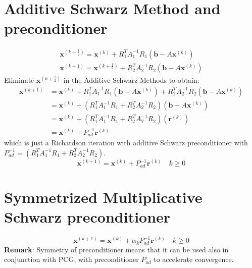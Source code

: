 \documentclass[11pt]{book}
\begin{document}
\section*{Additive Schwarz Method and preconditioner}

$$
\begin{gathered}
\mathbf{x}^{\left(k+\frac{1}{2}\right)}=\mathbf{x}^{(k)}+R_1^T A_1^{-1} R_1\left(\mathbf{b}-A \mathbf{x}^{(k)}\right) \\
\mathbf{x}^{(k+1)}=\mathbf{x}^{\left(k+\frac{1}{2}\right)}+R_2^T A_2^{-1} R_2\left(\mathbf{b}-A \mathbf{x}^{(k)}\right)
\end{gathered}
$$
Eliminate $\mathbf{x}^{\left(k+\frac{1}{2}\right)}$ in the Additive Schwarz Methods to obtain:
$$
\begin{aligned}
\mathbf{x}^{(k+1)} & =\mathbf{x}^{(k)}+R_1^T A_1^{-1} R_1\left(\mathbf{b}-A \mathbf{x}^{(k)}\right)+R_2^T A_2^{-1} R_2\left(\mathbf{b}-A \mathbf{x}^{(k)}\right) \\
& =\mathbf{x}^{(k)}+\left(R_1^T A_1^{-1} R_1+R_2^T A_2^{-1} R_2\right)\left(\mathbf{b}-A \mathbf{x}^{(k)}\right) \\
& =\mathbf{x}^{(k)}+\left(R_1^T A_1^{-1} R_1+R_2^T A_2^{-1} R_2\right)\left(\mathbf{r}^{(k)}\right) \\
& =\mathbf{x}^{(k)}+P_{a d}^{-1} \mathbf{r}^{(k)}
\end{aligned}
$$
which is just a Richardson iteration with additive Schwarz preconditioner with $P_{a d}^{-1}=\left(R_1^T A_1^{-1} R_1+R_2^T A_2^{-1} R_2\right)$.
$$
\mathbf{x}^{(k+1)}=\mathbf{x}^{(k)}+P_{a d}^{-1} \mathbf{r}^{(k)} \quad k \geq 0
$$

\section*{Symmetrized Multiplicative Schwarz preconditioner}
$$
\mathbf{x}^{(k+1)}=\mathbf{x}^{(k)}+\alpha_{k} P_{a d}^{-1} \mathbf{r}^{(k)} \quad k \geq 0
$$
\textbf{Remark}: Symmetry of preconditioner means that it can be used also in conjunction with PCG, with preconditioner $P_{a d}$ to accelerate convergence.
\end{document}
